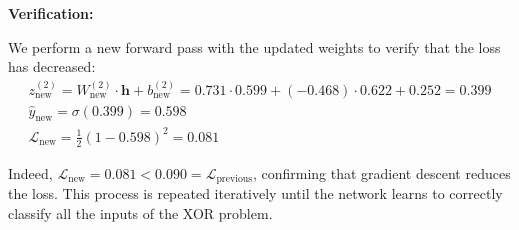 \textbf{Verification:}

We perform a new forward pass with the updated weights to verify that the loss has decreased:
\begin{gather*}
	z^{(2)}_{\text{new}} = W^{(2)}_{\text{new}} \cdot \mathbf{h} + b^{(2)}_{\text{new}} = 0.731 \cdot 0.599 + (-0.468) \cdot 0.622 + 0.252 = 0.399 \\
	\hat{y}_{\text{new}} = \sigma(0.399) = 0.598 \\
	\mathcal{L}_{\text{new}} = \frac{1}{2}(1 - 0.598)^2 = 0.081
\end{gather*}

Indeed, \(\mathcal{L}_{\text{new}} = 0.081 < 0.090 = \mathcal{L}_{\text{previous}}\), confirming that gradient descent reduces the loss. This process is repeated iteratively until the network learns to correctly classify all the inputs of the XOR problem.

